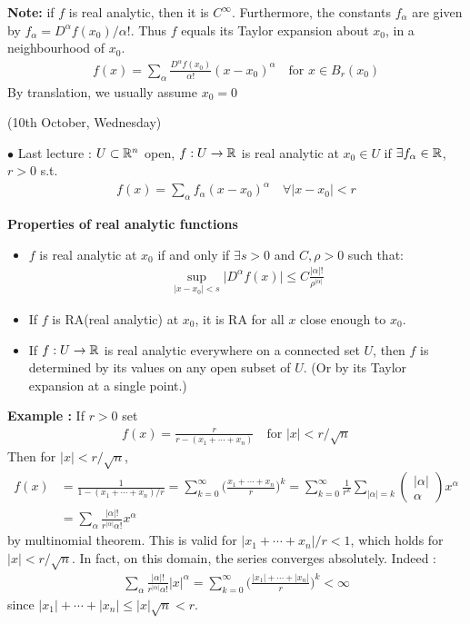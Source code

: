 \documentclass[12pt,a4paper]{report}
\begin{document}
\textbf{Note:} if $f$ is real analytic, then it is $C^{\infty}$. Furthermore, the constants $f_{\alpha}$ are given by $f_{\alpha} = D^{\alpha}f(x_0) /\alpha!$. Thus $f$ equals its Taylor expansion about $x_0$, in a neighbourhood of $x_0$.
\begin{align*}
f(x) = \sum_{\alpha} \frac{D^{\alpha}f(x_0)}{\alpha!} (x-x_0)^{\alpha} \quad \text{for } x \in B_r(x_0)
\end{align*}
By translation, we usually assume $x_0 =0$
\s

\newday

(10th October, Wednesday)
\s

$\bullet$ Last lecture : $U \subset \mathbb{R}^n$ open, $f: U \rightarrow \mathbb{R}$ is real analytic at $x_0 \in U$ if $\exists f_{\alpha} \in \mathbb{R}$, $r>0$ s.t.
\begin{align*}
f(x)  = \sum_{\alpha} f_{\alpha}(x-x_0)^{\alpha} \quad \forall |x-x_0|<r
\end{align*}
\s

\textbf{Properties of real analytic functions}
\begin{itemize}
\item $f$ is real analytic at $x_0$ if and only if $\exists s>0$ and $C,\rho>0$ such that:
\begin{align*}
\sup_{|x-x_0|< s}\big| D^{\alpha}f(x) \big| \leq C \frac{|\alpha|!}{\rho^{|\alpha|}}
\end{align*}
\item If $f$ is RA(real analytic) at $x_0$, it is RA for all $x$ close enough to $x_0$.
\item If $f: U \rightarrow \mathbb{R}$ is real analytic everywhere on a connected set $U$, then $f$ is determined by its values on any open subset of $U$. (Or by its Taylor expansion at a single point.)
\end{itemize}
\s

\textbf{Example :} If $r>0$ set
\begin{align*}
f(x) = \frac{r}{r-(x_1 + \cdots + x_n)} \quad \text{for } |x|<r/\sqrt{n}
\end{align*}
Then for $|x| < r/\sqrt{n}$,
\begin{align*}
f(x) &= \frac{1}{1-(x_1 + \cdots +x_n)/r} = \sum_{k=0}^{\infty} \Big( \frac{x_1 +\cdots +x_n}{r} \Big)^k = \sum_{k=0}^{\infty} \frac{1}{r^k} \sum_{|\alpha| = k} \begin{pmatrix}
|\alpha| \\
\alpha
\end{pmatrix} x^{\alpha} \\
& =  \sum_{\alpha} \frac{|\alpha|!}{r^{|\alpha|}\alpha!} x^{\alpha}
\end{align*}
by multinomial theorem. This is valid for $|x_1+\cdots +x_n|/r <1$, which holds for $|x|<r/\sqrt{n}$. In fact, on this domain, the series converges absolutely. Indeed :
\begin{align*}
\sum_{\alpha} \frac{|\alpha|!}{r^{|\alpha|}\alpha!} |x|^{\alpha} = \sum_{k=0}^{\infty} \Big( \frac{|x_1|+\cdots+|x_n|}{r} \Big)^k < \infty
\end{align*}
since $|x_1|+\cdots +|x_n| \leq |x| \sqrt{n} <r$.
\s
\end{document}
